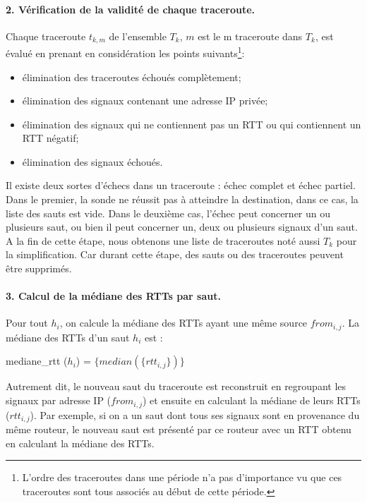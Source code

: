 \paragraph{2. Vérification de la validité de chaque traceroute.} 
Chaque traceroute $t_{k,m}$ de l'ensemble $T_k$, $m$  est le m  traceroute dans $T_k$,  est évalué en prenant en considération  les points suivants\footnote{L'ordre  des traceroutes dans une période n'a pas d'importance vu que ces traceroutes sont tous associés au début de cette période.}:
\begin{itemize}
	\item élimination des traceroutes échoués complètement;
	\item élimination des signaux contenant une adresse IP privée;
	\item élimination des signaux qui ne contiennent pas un RTT ou  qui contiennent un RTT négatif;
	\item élimination des signaux échoués.
\end{itemize}

Il existe deux sortes d'échecs dans un traceroute : échec complet et échec partiel. Dans le premier,   la sonde  ne réussit pas à atteindre la destination, dans ce cas, la liste des sauts est vide. Dans le deuxième cas, l'échec peut concerner un ou plusieurs saut, ou bien il peut concerner un, deux ou plusieurs signaux d'un saut. A la fin de cette étape, nous obtenons une liste de traceroutes noté aussi $T_k$ pour la simplification. Car durant cette étape, des sauts ou des traceroutes peuvent être supprimés.

\paragraph{3. Calcul de la médiane des RTTs par saut.} 
Pour tout $ h_i $,  on calcule la médiane des RTTs ayant une même source $from_{i,j}$.  La médiane des RTTs d'un saut $h_i$ est  :

mediane\_rtt ($h_i$) =  $\{median(\{rtt_{i, j}  \})\}$

Autrement dit, le nouveau saut du traceroute est reconstruit en regroupant les signaux par adresse IP ($ from_{i, j} $) et ensuite en calculant la médiane de leurs RTTs ($rtt_{i,j}$). Par exemple, si on a un saut dont tous ses  signaux sont en provenance du même routeur, le nouveau saut est présenté par ce routeur avec un RTT obtenu en calculant la médiane des  RTTs.


